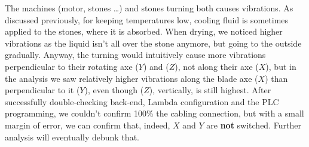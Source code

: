The machines (motor, stones \dots) and stones turning both causes vibrations. As discussed previously, for keeping temperatures low, cooling fluid is sometimes applied to the stones, 
where it is absorbed. When drying, we noticed higher vibrations as the liquid isn't all over the stone anymore, but going to the outside gradually.
Anyway, the turning would intuitively cause more vibrations perpendicular to their rotating axe ($Y$) and ($Z$), not along their axe ($X$), 
but in the analysis we saw relatively higher vibrations along the blade axe ($X$) than perpendicular to it ($Y$), even though ($Z$), vertically, is still highest. 
After successfully double-checking back-end, Lambda configuration and the \ac{PLC} programming, we couldn't confirm 100\% the cabling connection, but with a small margin of 
error, we can confirm that, indeed, $X$ and $Y$ are \textbf{not} switched. Further analysis will eventually debunk that. 


